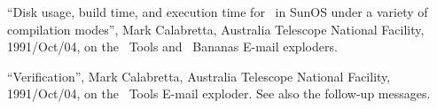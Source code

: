 \begin{thebibliography}{9}

 ``Disk usage, build time, and execution time for
	\AIPS\ in SunOS under a variety of compilation modes'',
	Mark Calabretta, Australia Telescope National Facility,
	1991/Oct/04, on the \AIPTOO\ Tools and \AIPS\ Bananas E-mail
	exploders.

 ``Verification'', Mark Calabretta, Australia
	Telescope National Facility, 1991/Oct/04, on the \AIPTOO\
	Tools E-mail exploder.  See also the follow-up messages.

\end{thebibliography}



